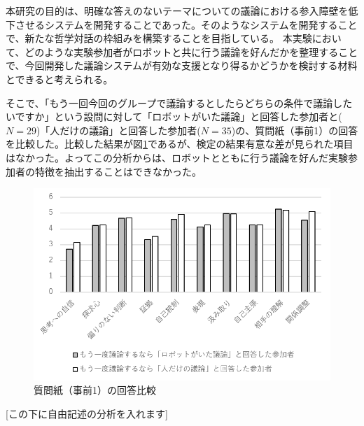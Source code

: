 \documentclass[11pt, a4paper]{jreport} %
\begin{document}
本研究の目的は、明確な答えのないテーマについての議論における参入障壁を低下させるシステムを開発することであった。そのようなシステムを開発することで、新たな哲学対話の枠組みを構築することを目指している。%
本実験において、どのような実験参加者がロボットと共に行う議論を好んだかを整理することで、今回開発した議論システムが有効な支援となり得るかどうかを検討する材料とできると考えられる。


そこで、「もう一回今回のグループで議論するとしたらどちらの条件で議論したいですか」という設問に対して「ロボットがいた議論」と回答した参加者と($N=29$)「人だけの議論」と回答した参加者($N=35$)の、質問紙（事前1）の回答を比較した。比較した結果が図\ref{fig:jikken3_seikaku}であるが、検定の結果有意な差が見られた項目はなかった。よってこの分析からは、ロボットとともに行う議論を好んだ実験参加者の特徴を抽出することはできなかった。


\begin{figure}[htbp]
\begin{center}
\includegraphics[width=150mm]{images/jikken3_seikaku.png}
\caption{質問紙（事前1）の回答比較}
\label{fig:jikken3_seikaku}
\end{center}
\end{figure}


[この下に自由記述の分析を入れます]



\end{document}
